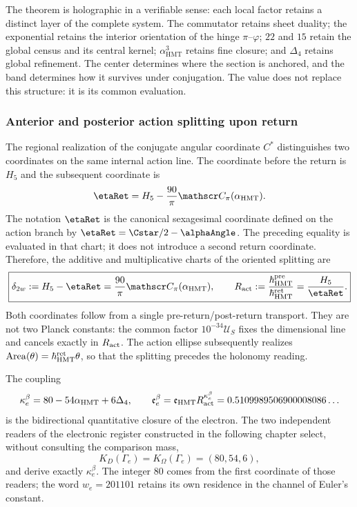 The theorem is holographic in a verifiable sense: each local factor
retains a distinct layer of the complete system. The commutator retains sheet
duality; the exponential retains the interior orientation of the
hinge \(\pi\)--\(\varphi\); \(22\) and \(15\) retain the global census and
its central kernel; \(\alpha_{\mathrm{HMT}}^3\) retains fine closure; and
\(\Delta_4\) retains global refinement. The center determines where the
section is anchored, and the band determines how it survives under conjugation.
The value does not replace this structure: it is its common evaluation.

\subsubsection{Anterior and posterior action splitting upon return}
\label{p12-83-c15-s2:sec:electron-desdoblamiento-two-way-rev9}

The regional realization of the conjugate angular coordinate \(C^*\) distinguishes two coordinates on the
same internal action line. The coordinate before the return is \(H_5\) and
the subsequent coordinate is
\[
\etaRet
 =H_5-\frac{90}{\pi}\mathscr C_\pi(\alpha_{\rm HMT}).
\]
The notation \(\etaRet\) is the canonical sexagesimal coordinate defined on the
action branch by \(\etaRet=\Cstar/2-\alphaAngle\). The preceding equality is
evaluated in that chart; it does not introduce a second return coordinate.
Therefore, the additive and multiplicative charts of the oriented splitting
are
\begin{equation}
 \boxed{
 \delta_{2w}:=H_5-\etaRet
 =\frac{90}{\pi}\mathscr C_\pi(\alpha_{\rm HMT}),
 \qquad
 R_{\rm act}:=\frac{\hbar^{\rm pre}_{\rm HMT}}
 {\hbar^{\rm ret}_{\rm HMT}}
 =\frac{H_5}{\etaRet}.}
 \label{p12-83-c15-s2:eq:electron-desdoblamiento-two-way-rev9}
\end{equation}
Both coordinates follow from a single pre-return/post-return transport.
They are not two Planck constants: the common factor
\(10^{-34}\mathcal U_S\) fixes the dimensional line and cancels exactly in
\(R_{\rm act}\). The action ellipse subsequently realizes
\(\operatorname{Area}(\theta)=\hbar_{\rm HMT}^{\rm ret}\theta\), so that
the splitting precedes the holonomy reading.

The coupling
\begin{equation}
 \kappa_e^{\beta}
 =80-54\alpha_{\rm HMT}+6\Delta_4,
 \qquad
 \mathfrak e_e^{\beta}
 =\mathfrak e_{\rm HMT}R_{\rm act}^{\kappa_e^{\beta}}
 =0.5109989506900008086\ldots
 \label{p12-83-c15-s2:eq:electron-beta-two-way-rev9}
\end{equation}
is the bidirectional quantitative closure of the electron. The two independent
readers of the electronic register constructed in the following chapter
select, without consulting the comparison mass,
\[
 K_D(\Gamma_e)=K_\Omega(\Gamma_e)=(80,54,6),
\]
and derive exactly \(\kappa_e^\beta\). The integer \(80\) comes from the
first coordinate of those readers; the word \(w_e=201101\) retains its
own residence in the channel of Euler's constant.

